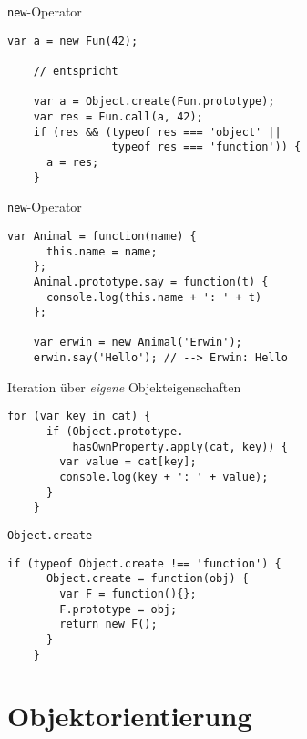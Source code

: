 \begin{frame}[fragile]{\lstinline-new--Operator}
  \begin{lstlisting}[gobble=4]
    var a = new Fun(42);

    // entspricht  
  
    var a = Object.create(Fun.prototype);
    var res = Fun.call(a, 42);
    if (res && (typeof res === 'object' ||
                typeof res === 'function')) {
      a = res;
    }
  \end{lstlisting}
\end{frame}

\begin{frame}[fragile]{\lstinline-new--Operator}
  \begin{lstlisting}[gobble=4]
    var Animal = function(name) {
      this.name = name;
    };
    Animal.prototype.say = function(t) {
      console.log(this.name + ': ' + t)
    };
    
    var erwin = new Animal('Erwin');
    erwin.say('Hello'); // --> Erwin: Hello
  \end{lstlisting}
\end{frame}

\begin{frame}[fragile]{Iteration über \emph{eigene} Objekteigenschaften}
  \begin{lstlisting}[gobble=4]
    for (var key in cat) {
      if (Object.prototype.
          hasOwnProperty.apply(cat, key)) {
        var value = cat[key];
        console.log(key + ': ' + value);
      }
    }
  \end{lstlisting}
\end{frame}

\begin{frame}[fragile]{\lstinline-Object.create-}
  \begin{lstlisting}[gobble=4]
    if (typeof Object.create !== 'function') {
      Object.create = function(obj) {
        var F = function(){};
        F.prototype = obj;
        return new F();
      }
    }
  \end{lstlisting}  
\end{frame}

\section{Objektorientierung}


